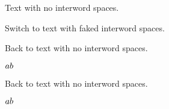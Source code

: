 




Text with no interword spaces.

\pdfinterwordspaceon

Switch to text with faked interword spaces.

\pdfinterwordspaceoff

Back to text with no interword \pdffakespace spaces.

\pdffakespace

$a\pdffakespace b$

Back to text with no interword \pdffakespace\pdffakespace spaces.

\pdffakespace
\pdffakespace

$a\pdffakespace \pdffakespace b$
\bye
